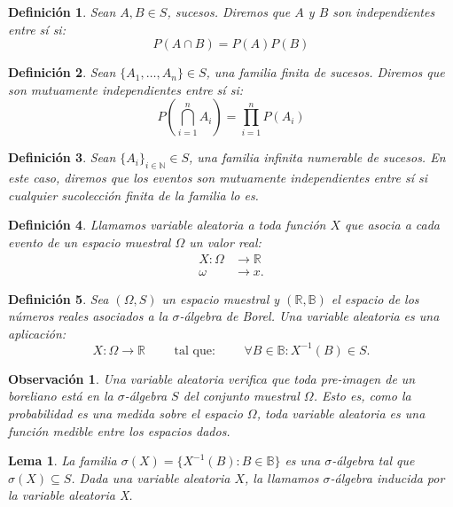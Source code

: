 \documentclass{report}
\newtheorem{lem}{Lema}[subsection]
\newtheorem{dfn}{Definición}[subsection]
\newtheorem{obs}{Observación}[subsection]
\begin{document}
\begin{dfn}
Sean $A, B\in S$, sucesos. Diremos que $A$ y $B$ son \emph{independientes} entre sí si:
$$
P(A\cap B) = P(A)P(B)
$$
\end{dfn}

\begin{dfn}
Sean $\{A_1, \ldots, A_n\}\in S$, una familia finita de sucesos. Diremos que son \emph{mutuamente independientes} entre sí si:
$$
P\left(\bigcap_{i=1}^n A_i \right) = \prod_{i=1}^{n} P(A_i)
$$
\end{dfn}

\begin{dfn}
Sean $\{A_i\}_{i\in\mathbb{N}}\in S$, una familia infinita numerable de sucesos. En este caso, diremos que los eventos son mutuamente
independientes entre sí si cualquier sucolección finita de la familia lo es.
\end{dfn}

\begin{dfn}
Llamamos \emph{variable aleatoria} a toda función $X$ que asocia a cada evento de un espacio muestral $\Omega$ un valor real:
\begin{equation*}
\begin{split}
    X: \Omega & \rightarrow \mathbb{R} \\
    \omega & \rightarrow x.
\end{split}
\end{equation*}
\end{dfn}

\begin{dfn}
    Sea $(\Omega, S)$ un espacio muestral y $(\mathbb{R}, \mathbb{B})$ el espacio de los números reales asociados a la $\sigma$-álgebra de Borel. Una 
    variable aleatoria es una aplicación:
    \begin{equation*}
        X: \Omega \rightarrow \mathbb{R} \qquad \text{ tal que: }  \qquad \forall B \in \mathbb{B}: X^{-1}(B) \in S.
    \end{equation*}

\end{dfn}

\begin{obs}
Una variable aleatoria verifica que toda pre-imagen de un boreliano está en la $\sigma$-álgebra $S$ del conjunto muestral $\Omega$. Esto es,
como la probabilidad es una medida sobre el espacio $\Omega$, toda variable aleatoria es una función medible entre los espacios dados.
\end{obs}

\begin{lem}
    La familia $\sigma(X)=\{X^{-1}(B): B\in\mathbb{B}\}$ es una $\sigma$-álgebra tal que $\sigma(X)\subseteq S$. Dada 
    una variable aleatoria $X$, la llamamos $\sigma$-álgebra \emph{inducida} por la variable aleatoria X.
\end{lem}
\end{document}
